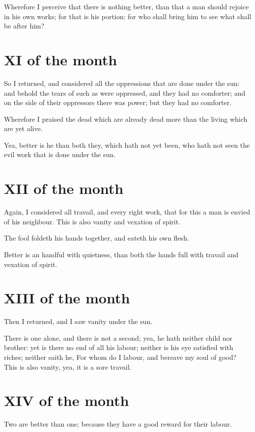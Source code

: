 Wherefore I perceive that there is nothing better, than that a man should rejoice in his own works; for that is his portion: for who shall bring him to see what shall be after him?

\section{XI of the month}

So I returned, and considered all the oppressions that are done under the sun: and behold the tears of such as were oppressed, and they had no comforter; and on the side of their oppressors there was power; but they had no comforter.

Wherefore I praised the dead which are already dead more than the living which are yet alive.

Yea, better is he than both they, which hath not yet been, who hath not seen the evil work that is done under the sun.

\section{XII of the month}

Again, I considered all travail, and every right work, that for this a man is envied of his neighbour. This is also vanity and vexation of spirit.

The fool foldeth his hands together, and eateth his own flesh.

Better is an handful with quietness, than both the hands full with travail and vexation of spirit.

\section{XIII of the month}

Then I returned, and I saw vanity under the sun.

There is one alone, and there is not a second; yea, he hath neither child nor brother: yet is there no end of all his labour; neither is his eye satisfied with riches; neither saith he, For whom do I labour, and bereave my soul of good? This is also vanity, yea, it is a sore travail.

\section{XIV of the month}

Two are better than one; because they have a good reward for their labour.


